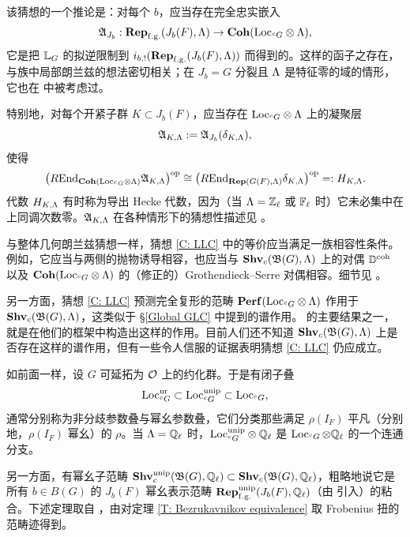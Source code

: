 该猜想的一个推论是：对每个 $b$，应当存在完全忠实嵌入
\begin{equation*}\label{E: functor A}
{\mathfrak A}_{J_b}:  {\mathbf{Rep}}_{\operatorname{f.g.}}(J_b(F),{\Lambda})\to  {\mathbf{Coh}}({\operatorname{Loc}}_{{}^cG}\otimes{\Lambda}),
\end{equation*}
它是把 ${\mathbb L}_G$ 的拟逆限制到 $i_{b,!}({\mathbf{Rep}}_{\operatorname{f.g.}}(J_b(F),{\Lambda}))$ 而得到的。这样的函子之存在，与族中局部朗兰兹的想法密切相关；在 $J_b=G$ 分裂且 ${\Lambda}$ 是特征零的域的情形，它也在 \cite{Hellmann-Iwahori, BCHN} 中被考虑过。

特别地，对每个开紧子群 $K\subset J_b(F)$，应当存在 ${\operatorname{Loc}}_{{}^cG}\otimes{\Lambda}$ 上的凝聚层
\begin{equation}\label{E: sheaf A}
{\mathfrak A}_{K,{\Lambda}}:={\mathfrak A}_{J_b}(\delta_{K,{\Lambda}}),
\end{equation}
使得
\begin{equation}\label{E: Hecke alg isom}
\big(R{\operatorname{End}}_{{\mathbf{Coh}}({\operatorname{Loc}}_{{}^cG}\otimes{\Lambda})}{\mathfrak A}_{K,{\Lambda}}\big)^{{\operatorname{op}}}\cong \big(R{\operatorname{End}}_{{\mathbf{Rep}}(G(F),{\Lambda})}\delta_{K,{\Lambda}}\big)^{{\operatorname{op}}}=:H_{K,{\Lambda}}.
\end{equation}
代数 $H_{K,{\Lambda}}$ 有时称为导出 Hecke 代数，因为（当 ${\Lambda}={\mathbb Z}_\ell$ 或 ${\mathbb F}_\ell$ 时）它未必集中在上同调次数零。${\mathfrak A}_{K,{\Lambda}}$ 在各种情形下的猜想性描述见 \cite[Sect. 4.3-4.5]{Zhu-Conjecture}。

与整体几何朗兰兹猜想一样，猜想 \ref{C: LLC} 中的等价应当满足一族相容性条件。例如，它应当与两侧的抛物诱导相容，也应当与 ${\mathbf{Shv}}_c({\mathfrak B}(G),{\Lambda})$ 上的对偶 ${\mathbb D}^{{\operatorname{coh}}}$ 以及 ${\mathbf{Coh}}({\operatorname{Loc}}_{{}^cG}\otimes{\Lambda})$ 的（修正的）Grothendieck--Serre 对偶相容。细节见 \cite{Zhu-Conjecture, Hemo-Zhu-Unipotent}。

另一方面，猜想 \ref{C: LLC} 预测完全复形的范畴 ${\mathbf{Perf}}({\operatorname{Loc}}_{{}^cG}\otimes{\Lambda})$ 作用于 ${\mathbf{Shv}}_c({\mathfrak B}(G),{\Lambda})$，这类似于 \S\ref{Global GLC} 中提到的谱作用。\cite{Fargues-Scholze-Geometrization} 的主要结果之一，就是在他们的框架中构造出这样的作用。目前人们还不知道 ${\mathbf{Shv}}_c({\mathfrak B}(G),{\Lambda})$ 上是否存在这样的谱作用，但有一些令人信服的证据表明猜想 \ref{C: LLC} 仍应成立。

如前面一样，设 $G$ 可延拓为 ${\mathcal O}$ 上的约化群。于是有闭子叠
\[{\operatorname{Loc}}_{{}^cG}^{{\operatorname{ur}}}\subset{\operatorname{Loc}}_{{}^cG}^{{\operatorname{unip}}}\subset {\operatorname{Loc}}_{{}^cG},\]
通常分别称为非分歧参数叠与幂幺参数叠，它们分类那些满足 $\rho(I_F)$ 平凡（分别地，$\rho(I_F)$ 幂幺）的 $\rho$。当 ${\Lambda}={\mathbb Q}_\ell$ 时，${\operatorname{Loc}}_{{}^cG}^{{\operatorname{unip}}}\otimes{\mathbb Q}_\ell$ 是 $\operatorname{Loc}_{{}^cG}\otimes{\mathbb Q}_\ell$ 的一个连通分支。

另一方面，有幂幺子范畴 ${\mathbf{Shv}}_c^{{\operatorname{unip}}}({{\mathfrak B}}(G),{\mathbb Q}_\ell)\subset {\mathbf{Shv}}_c({{\mathfrak B}}(G),{\mathbb Q}_\ell)$，粗略地说它是所有 $b\in B(G)$ 的 $J_b(F)$ 幂幺表示范畴 ${\mathbf{Rep}}_{\operatorname{f.g.}}^{{\operatorname{unip}}}(J_b(F),{\mathbb Q}_\ell)$（由 \cite{Lusztig-Unipotent} 引入）的粘合。下述定理取自 \cite{Hemo-Zhu-Unipotent}，由对定理 \ref{T: Bezrukavnikov equivalence} 取 Frobenius 扭的范畴迹得到。

